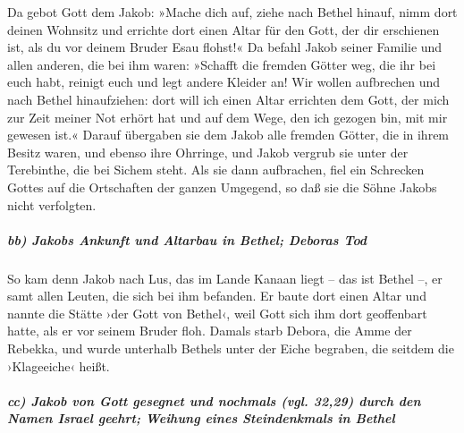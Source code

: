  Da gebot Gott dem Jakob: »Mache dich auf, ziehe nach
Bethel hinauf, nimm dort deinen Wohnsitz und errichte dort einen Altar
für den Gott, der dir erschienen ist, als du vor deinem Bruder Esau
flohst!«  Da befahl Jakob seiner Familie und allen
anderen, die bei ihm waren: »Schafft die fremden Götter weg, die ihr bei
euch habt, reinigt euch und legt andere Kleider an!  Wir
wollen aufbrechen und nach Bethel hinaufziehen: dort will ich einen
Altar errichten dem Gott, der mich zur Zeit meiner Not erhört hat und
auf dem Wege, den ich gezogen bin, mit mir gewesen ist.« 
Darauf übergaben sie dem Jakob alle fremden Götter, die in ihrem Besitz
waren, und ebenso ihre Ohrringe, und Jakob vergrub sie unter der
Terebinthe, die bei Sichem steht.  Als sie dann
aufbrachen, fiel ein Schrecken Gottes auf die Ortschaften der ganzen
Umgegend, so daß sie die Söhne Jakobs nicht verfolgten.

\hypertarget{bb-jakobs-ankunft-und-altarbau-in-bethel-deboras-tod}{%
\subparagraph{bb) Jakobs Ankunft und Altarbau in Bethel; Deboras
Tod}\label{bb-jakobs-ankunft-und-altarbau-in-bethel-deboras-tod}}

 So kam denn Jakob nach Lus, das im Lande Kanaan liegt --
das ist Bethel --, er samt allen Leuten, die sich bei ihm befanden.
 Er baute dort einen Altar und nannte die Stätte ›der Gott
von Bethel‹, weil Gott sich ihm dort geoffenbart hatte, als er vor
seinem Bruder floh.  Damals starb Debora, die Amme der
Rebekka, und wurde unterhalb Bethels unter der Eiche begraben, die
seitdem die ›Klageeiche‹ heißt.

\hypertarget{cc-jakob-von-gott-gesegnet-und-nochmals-vgl.-3229-durch-den-namen-israel-geehrt-weihung-eines-steindenkmals-in-bethel}{%
\subparagraph{cc) Jakob von Gott gesegnet und nochmals (vgl. 32,29)
durch den Namen Israel geehrt; Weihung eines Steindenkmals in
Bethel}\label{cc-jakob-von-gott-gesegnet-und-nochmals-vgl.-3229-durch-den-namen-israel-geehrt-weihung-eines-steindenkmals-in-bethel}}

